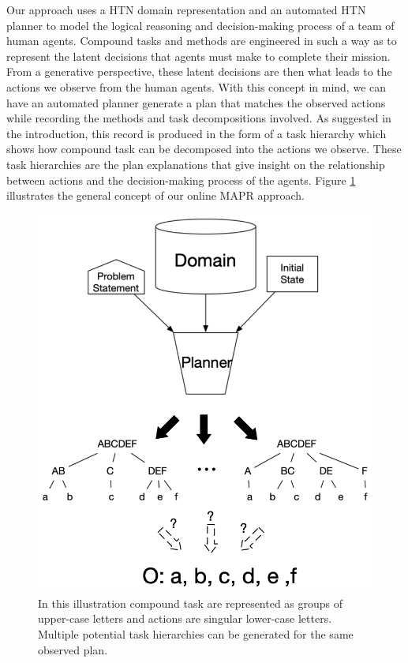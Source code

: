 Our approach uses a HTN domain representation and an automated HTN planner to model the logical reasoning and decision-making process of a team of human agents. Compound tasks and methods are engineered in such a way as to represent the latent decisions that agents must make to complete their mission. From a generative perspective, these latent decisions are then what leads to the actions we observe from the human agents. With this concept in mind, we can have an automated planner generate a plan that matches the observed actions while recording the methods and task decompositions involved. As suggested in the introduction, this record is produced in the form of a task hierarchy which shows how compound task can be decomposed into the actions we observe. These task hierarchies are the plan explanations that give insight on the relationship between actions and the decision-making process of the agents. Figure \ref{fig:2} illustrates the general concept of our online MAPR approach.

\begin{figure}[h]
    \centering
    \includegraphics[width=1\textwidth]{images/pr_as_planning}
    \caption{In this illustration compound task are represented as groups of upper-case letters and actions are singular lower-case letters. Multiple potential task hierarchies can be generated for the same observed plan.} 
    \label{fig:2}
\end{figure}

